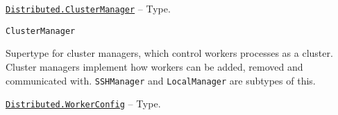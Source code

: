 \hypertarget{1673650075671996993}{} 
\hyperlink{1673650075671996993}{\texttt{Distributed.ClusterManager}}  -- {Type.}

\begin{adjustwidth}{2em}{0pt}


\begin{verbatim}
ClusterManager
\end{verbatim}

Supertype for cluster managers, which control workers processes as a cluster. Cluster managers implement how workers can be added, removed and communicated with. \texttt{SSHManager} and \texttt{LocalManager} are subtypes of this.



\end{adjustwidth}
\hypertarget{3351347791553517124}{} 
\hyperlink{3351347791553517124}{\texttt{Distributed.WorkerConfig}}  -- {Type.}

